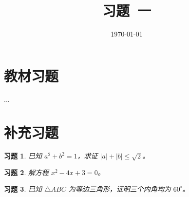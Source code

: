 \documentclass[12pt,a4paper]{article}
\title{习题\ 一}
\date{\today}
\newtheorem{exercise}{习题}
\newenvironment{solution}{\par\noindent\textbf{【解答】}\quad}{\hfill$\Box$\par}
\begin{document}
\maketitle
\section{教材习题}
...

\section{补充习题}
\begin{exercise}
已知 $a^2 + b^2 = 1$，求证 $|a| + |b| \leq \sqrt{2}$。
\end{exercise}



\begin{exercise}
解方程 $x^2 - 4x + 3 = 0$。
\end{exercise}




\begin{exercise}
已知 $\triangle ABC$ 为等边三角形，证明三个内角均为 $60^\circ$。
\end{exercise}

\end{document}
